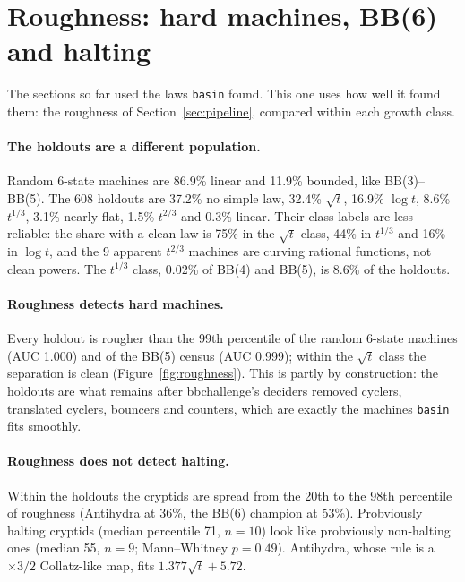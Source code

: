 \documentclass[11pt,a4paper]{article}
\newcommand{\BB}[1]{BB(#1)}
\begin{document}
\section{Roughness: hard machines, BB(6) and halting}
\label{sec:bb6}

The sections so far used the laws \texttt{basin} found. This one uses how well it found them: the
roughness of Section~\ref{sec:pipeline}, compared within each growth class.

\paragraph{The holdouts are a different population.} Random 6-state machines are 86.9\% linear and
11.9\% bounded, like \BB{3}--\BB{5}. The 608 holdouts are 37.2\% no simple law, 32.4\% $\sqrt t$,
16.9\% $\log t$, 8.6\% $t^{1/3}$, 3.1\% nearly flat, 1.5\% $t^{2/3}$ and 0.3\% linear. Their class
labels are less reliable: the share with a clean law is 75\% in the $\sqrt t$ class, 44\% in
$t^{1/3}$ and 16\% in $\log t$, and the 9 apparent $t^{2/3}$ machines are curving rational
functions, not clean powers. The $t^{1/3}$ class, 0.02\% of \BB{4} and \BB{5}, is 8.6\% of the
holdouts.

\paragraph{Roughness detects hard machines.} Every holdout is rougher than the 99th percentile of
the random 6-state machines (AUC 1.000) and of the \BB{5} census (AUC 0.999); within the $\sqrt t$
class the separation is clean (Figure~\ref{fig:roughness}). This is partly by construction: the
holdouts are what remains after bbchallenge's deciders removed cyclers, translated cyclers,
bouncers and counters, which are exactly the machines \texttt{basin} fits smoothly.

\paragraph{Roughness does not detect halting.} Within the holdouts the cryptids are spread from
the 20th to the 98th percentile of roughness (Antihydra at 36\%, the \BB{6} champion at 53\%).
Probviously halting cryptids (median percentile 71, $n=10$) look like probviously non-halting ones
(median 55, $n=9$; Mann--Whitney $p = 0.49$). Antihydra, whose rule is a $\times3/2$ Collatz-like
map, fits $1.377\sqrt t + 5.72$.
\end{document}
